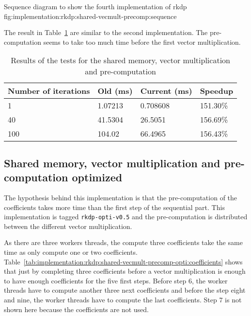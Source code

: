 {Sequence diagram to show the fourth implementation of \acrshort{rkdp}}
{fig:implementation:rkdp:shared-vecmult-precomp:sequence}

The result in Table~\ref{tab:implementation:rkdp:shared-vecmult-pre-computed:results}
are similar to the second implementation.
The pre-computation seems to take too much time before the first vector
multiplication.

\begin{table}[ht]
    \centering
    \begin{tabular}{|l|l|l|l|}
        \hline
        \textbf{Number of iterations} & \textbf{Old (ms)} & \textbf{Current (ms)} & \textbf{Speedup} \\
        \hline
        1 & 1.07213 & 0.708608 & 151.30\% \\
        \hline
        40 & 41.5304 & 26.5051 & 156.69\% \\
        \hline
        100 & 104.02 & 66.4965 & 156.43\% \\
        \hline
    \end{tabular}
    \caption{Results of the tests for the shared memory, vector multiplication and pre-computation}
    \label{tab:implementation:rkdp:shared-vecmult-pre-computed:results}
\end{table}


\subsection{Shared memory, vector multiplication and pre-computation optimized}
\label{ch:implementation:rkdp:shared-vecmult-precomp-opti}

The hypothesis behind this implementation is that the pre-computation of the
coefficients takes more time than the first step of the sequential part.
This implementation is tagged \texttt{rkdp-opti-v0.5} and the pre-computation is
distributed between the different vector multiplication.

As there are three workers threads, the compute three coefficients take the same
time as only compute one or two coefficients.
Table~\ref{tab:implementation:rkdp:shared-vecmult-precomp-opti:coefficients}
shows that just by completing three coefficients before a vector multiplication
is enough to have enough coefficients for the five first steps.
Before step 6, the worker threads have to compute another three next
coefficients and before the step eight and nine, the worker threads have to
compute the last coefficients.
Step 7 is not shown here because the coefficients are not used.

